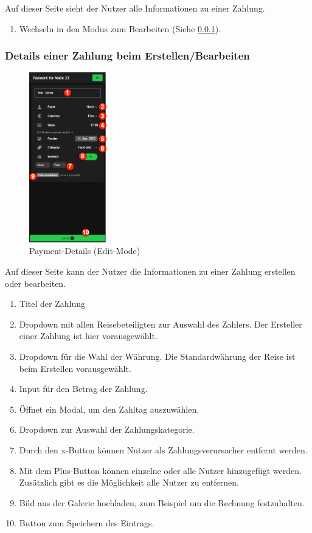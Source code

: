 Auf dieser Seite sieht der Nutzer alle Informationen zu einer Zahlung.

\begin{enumerate}[label=\protect\circled{\arabic*}]
	\item Wechseln in den Modus zum Bearbeiten (Siehe \ref{payment-details_(edit-mode)}).
\end{enumerate}

\subsubsection{Details einer Zahlung beim Erstellen/Bearbeiten}\label{payment-details_(edit-mode)}
\begin{figure}[H]
	\centering
	\includegraphics[width=0.3\textwidth]{img/pages_numbers/payment-details_(edit-mode).drawio}
	\caption[Payment-Details (Edit-Mode)]{Payment-Details (Edit-Mode)}
	\label{fig:payment-details_(edit-mode)}
\end{figure}

Auf dieser Seite kann der Nutzer die Informationen zu einer Zahlung erstellen oder bearbeiten.

\begin{enumerate}[label=\protect\circled{\arabic*}]
	\item Titel der Zahlung
	\item Dropdown mit allen Reisebeteiligten zur Auswahl des Zahlers. Der Ersteller einer Zahlung ist hier 			vorausgewählt.
	\item Dropdown für die Wahl der Währung. Die Standardwährung der Reise ist beim Erstellen vorausgewählt.
	\item Input für den Betrag der Zahlung.
	\item Öffnet ein Modal, um den Zahltag auszuwählen.
	\item Dropdown zur Auswahl der Zahlungskategorie.
	\item Durch den x-Button können Nutzer als Zahlungsverursacher entfernt werden.
	\item Mit dem Plus-Button können einzelne oder alle Nutzer hinzugefügt werden. Zusätzlich gibt es die Möglichkeit alle Nutzer zu entfernen.
	\item Bild aus der Galerie hochladen, zum Beispiel um die Rechnung festzuhalten.
	\item Button zum Speichern des Eintrags.
\end{enumerate}


